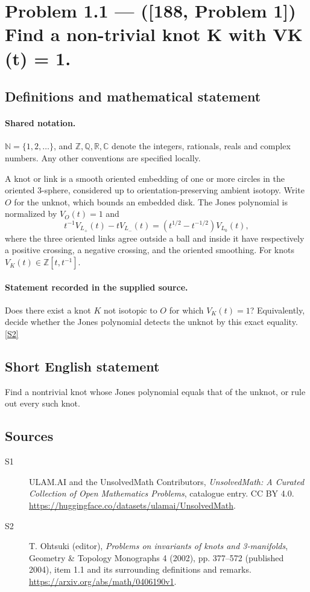 \documentclass[11pt]{article}
\newcommand{\sref}[2]{\hyperlink{source:#1:#2}{[S#2]}}
\begin{document}
\section{Problem 1.1 — ([188, Problem 1]) Find a non-trivial knot K with VK (t) = 1.}\label{statement}

\subsection{Definitions and mathematical statement}

\paragraph{Shared notation.}$\mathbb N=\{1,2,\ldots\}$, and $\mathbb Z,\mathbb Q,\mathbb R,\mathbb C$ denote the integers, rationals, reals and complex numbers. Any other conventions are specified locally.


A knot or link is a smooth oriented embedding of one or more circles in the oriented $3$-sphere, considered up to orientation-preserving ambient isotopy. Write $O$ for the unknot, which bounds an embedded disk. The Jones polynomial is normalized by $V_O(t)=1$ and
\[t^{-1}V_{L_+}(t)-tV_{L_-}(t)=(t^{1/2}-t^{-1/2})V_{L_0}(t),\]
where the three oriented links agree outside a ball and inside it have respectively a positive crossing, a negative crossing, and the oriented smoothing. For knots $V_K(t)\in\mathbb Z[t,t^{-1}]$.
\paragraph{Statement recorded in the supplied source.}
Does there exist a knot $K$ not isotopic to $O$ for which $V_K(t)=1$? Equivalently, decide whether the Jones polynomial detects the unknot by this exact equality. \sref{statement}{2}
\subsection{Short English statement}
Find a nontrivial knot whose Jones polynomial equals that of the unknot, or rule out every such knot.
\subsection{Sources}
\begin{description}
\item[\hypertarget{source:statement:1}{S1}] ULAM.AI and the UnsolvedMath Contributors, \emph{UnsolvedMath: A Curated Collection of Open Mathematics Problems}, catalogue entry. CC BY 4.0. \url{https://huggingface.co/datasets/ulamai/UnsolvedMath}.
\item[\hypertarget{source:statement:2}{S2}] T. Ohtsuki (editor), \emph{Problems on invariants of knots and 3-manifolds}, Geometry \& Topology Monographs 4 (2002), pp. 377--572 (published 2004), item 1.1 and its surrounding definitions and remarks. \url{https://arxiv.org/abs/math/0406190v1}.
\end{description}
\label{end:statement}
\end{document}
